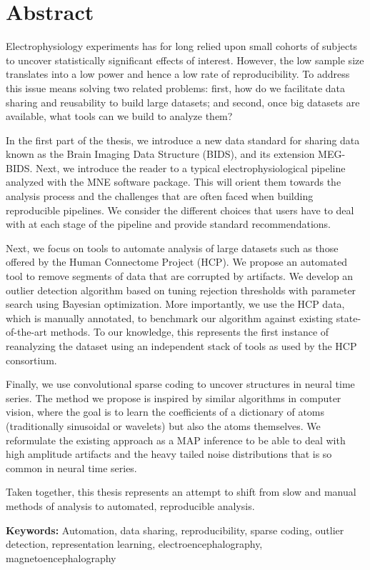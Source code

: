 \chapter*{Abstract}

Electrophysiology experiments has for long relied upon small cohorts of subjects to uncover statistically significant effects of interest. However, the low sample size translates into a low power and hence a low rate of reproducibility. To address this issue means solving two related problems: first, how do we  facilitate data sharing and reusability to build large datasets; and second, once big datasets are available, what tools can we build to analyze them?

In the first part of the thesis, we introduce a new data standard for sharing data known as the Brain Imaging Data Structure (BIDS), and its extension MEG-BIDS. Next, we introduce the reader to a typical electrophysiological pipeline analyzed with the MNE software package. This will orient them towards the analysis process and the challenges that are often faced when building reproducible pipelines. We consider the different choices that users have to deal with at each stage of the pipeline and provide standard recommendations.

Next, we focus on tools to automate analysis of large datasets such as those offered by the Human Connectome Project (HCP). We propose an automated tool to remove segments of data that are corrupted by artifacts. We develop an outlier detection algorithm based on tuning rejection thresholds with parameter search using Bayesian optimization. More importantly, we use the HCP data, which is manually annotated, to benchmark our algorithm against existing state-of-the-art methods. To our knowledge, this represents the first instance of reanalyzing the dataset using an independent stack of tools as used by the HCP consortium.

Finally, we use convolutional sparse coding to uncover structures in neural time series. The method we propose is inspired by similar algorithms in computer vision, where the goal is to learn the coefficients of a dictionary of atoms (traditionally sinusoidal or wavelets) but also the atoms themselves. We reformulate the existing approach as a \ac{MAP} inference to be able to deal with high amplitude artifacts and the heavy tailed noise distributions that is so common in neural time series. 

Taken together, this thesis represents an attempt to shift from slow and manual methods of analysis to automated, reproducible analysis.

\textbf{Keywords:} Automation, data sharing, reproducibility, sparse coding, outlier detection, representation learning, electroencephalography, magnetoencephalography